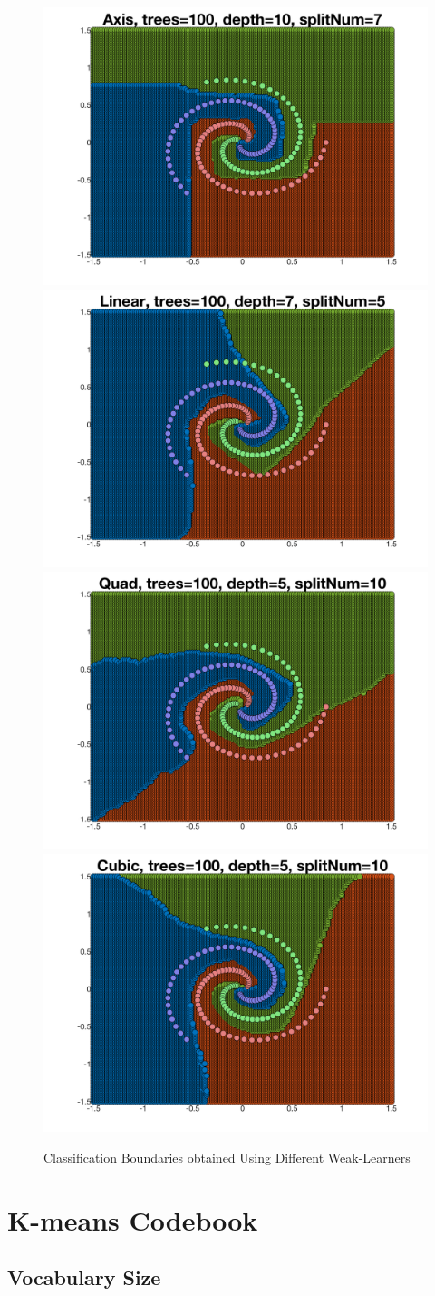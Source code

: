 \documentclass[a4paper,pra,twocolumn,10pt,aps,longbibliography,nobalancelastpage]{article}
\begin{document}
\begin{figure}[H]
	\centering
    \includegraphics[width=0.40\columnwidth]{axis}
	\includegraphics[width=0.40\columnwidth]{linear}
    \includegraphics[width=0.40\columnwidth]{quad}
    \includegraphics[width=0.40\columnwidth]{cubic}
    \caption{Classification Boundaries obtained Using Different Weak-Learners}
\end{figure}


\section{K-means Codebook}

\subsection{Vocabulary Size}
\end{document}
